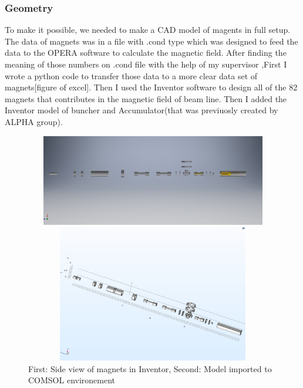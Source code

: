 \documentclass[12pt,a4paper]{article}
\begin{document}
\subsubsection{Geometry}
To make it possible, we needed to make a CAD model of magents in full setup. The data of magnets was in a file with .cond type which was designed to feed the data to the OPERA software to calculate the magnetic field. After finding the meaning of those numbers on .cond file with the help of my supervisor ,First I wrote a python code to transfer those data to a more clear data set of magnets[figure of excel]. Then I used the Inventor software to design all of the 82 magnets that contributes in the magnetic field of beam line. Then I added the Inventor model of buncher and Accumulator(that was previuosly created by ALPHA group).

\begin{figure}[h]
\centering

\includegraphics[width=120mm,
height=40mm]{full-beam-line-half}

\includegraphics[width=120mm, height=60mm]{full-comsol}
\caption{First: Side view of magnets in Inventor, Second: Model imported to COMSOL environement }
\end{figure}
\end{document}
